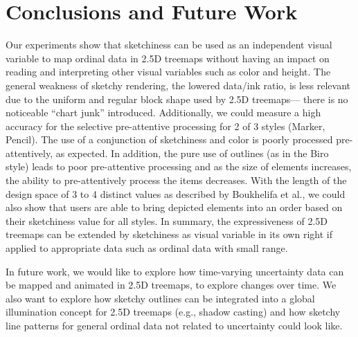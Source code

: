 
\section{Conclusions and Future Work}
\label{sec:conclusion}

\noindent
Our experiments show that sketchiness can be used as an independent visual variable to map ordinal data in 2.5D treemaps without having an impact on reading and interpreting other visual variables such as color and height. 
The general weakness of sketchy rendering, 
the lowered data/ink ratio, 
is less relevant due to the uniform and regular block shape used by 2.5D treemaps---%
there is no noticeable \enquote{chart junk} \cite{Tufte1986} introduced.
Additionally, we could measure a high accuracy for the selective pre-attentive processing for 2 of 3 styles (Marker, Pencil). 
The use of a conjunction of sketchiness and color is poorly processed pre-attentively, as expected. 
In addition, the pure use of outlines (as in the Biro style) leads to poor pre-attentive processing 
and as the size of elements increases, the ability to pre-attentively process the items decreases. 
With the length of the design space of 3 to 4 distinct values as described by Boukhelifa et al., we could also show that users are able to bring depicted elements into an order 
based on their sketchiness value for all styles. 
In summary, the expressiveness of 2.5D treemaps can be extended by sketchiness as visual variable in its own right if applied to appropriate data such as ordinal data with small range. 

In future work, we would like to explore how time-varying uncertainty data can be mapped and animated in 2.5D treemaps, \eg to explore changes over time. 
We also want to explore how sketchy outlines can be integrated into a global illumination concept for 2.5D treemaps (e.g., shadow casting) and how sketchy line patterns for general ordinal data not related to uncertainty could look like.

